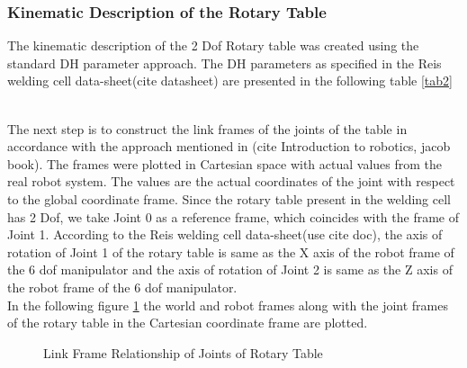 \subsubsection{Kinematic Description of the Rotary Table}

The kinematic description of the 2 Dof Rotary table was created using the standard DH parameter approach. The DH parameters as specified in the Reis welding cell data-sheet(cite datasheet) are presented in the following table \ref{tab2}
\begin{table}[!htbp]
\centering
{}
\caption{DH parameter of Rotary Table}
\label{tab2}
\end{table}
\\
The next step is to construct the link frames of the joints of the table in accordance with the approach mentioned in (cite Introduction to robotics, jacob book). The frames were plotted in Cartesian space with actual values from the real robot system. The values are the actual coordinates of the joint with respect to the global coordinate frame. Since the rotary table present in the welding cell has 2 Dof, we take Joint 0 as a reference frame, which coincides with the frame of Joint 1. According to the Reis welding cell data-sheet(use cite doc), the axis of rotation of Joint 1 of the rotary table is same as the X axis of the robot frame of the 6 dof manipulator and the axis of rotation of Joint 2 is same as the Z axis of the robot frame of the 6 dof manipulator. \\
In the following figure \ref{fig:img12} the world and robot frames along with the joint frames of the rotary table in the Cartesian coordinate frame are plotted. 
\begin{figure}[!htbp] %
 \centering
   \caption{Link Frame Relationship of Joints of Rotary Table}  
\label{fig:img12}
\end{figure}

